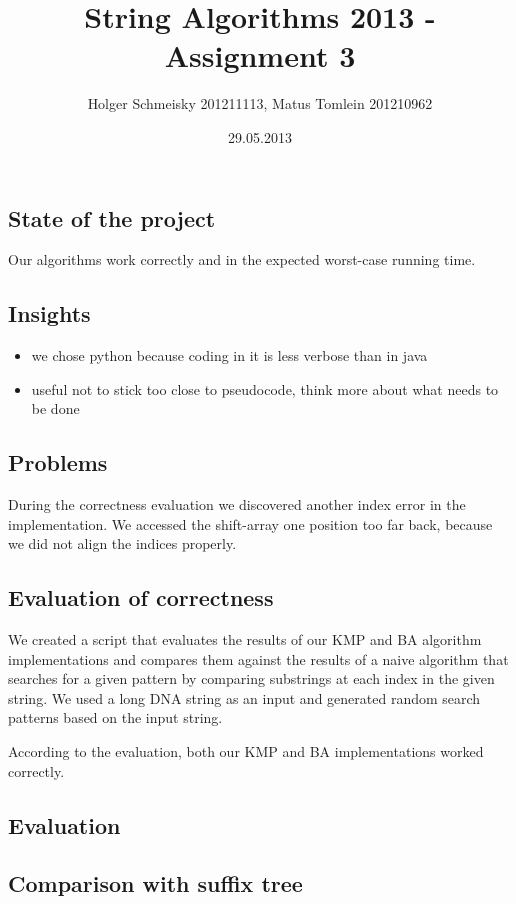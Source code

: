 \documentclass[a4paper,10pt]{article}
\title{String Algorithms 2013 - Assignment 3}
\author{Holger Schmeisky  201211113, Matus Tomlein 201210962}
\date{29.05.2013}
\begin{document}
\maketitle

\subsection*{State of the project}
Our algorithms work correctly and in the expected worst-case running time.

\subsection*{Insights}
\begin{itemize}
  \item we chose python because coding in it is less verbose than in java
  \item useful not to stick too close to pseudocode, think more about what needs to be done
\end{itemize}

\subsection*{Problems}
During the correctness evaluation we discovered another index error in the implementation. We accessed the shift-array one position too far back, because we did not align the indices properly.

\subsection*{Evaluation of correctness}

We created a script that evaluates the results of our KMP and BA algorithm
implementations and compares them against the results of a naive algorithm
that searches for a given pattern by comparing substrings at each index
in the given string.
We used a long DNA string as an input and generated random search patterns
based on the input string.

According to the evaluation, both our KMP and BA implementations worked
correctly.

\clearpage
\subsection*{Evaluation}

\subsection*{Comparison with suffix tree}
\end{document}
